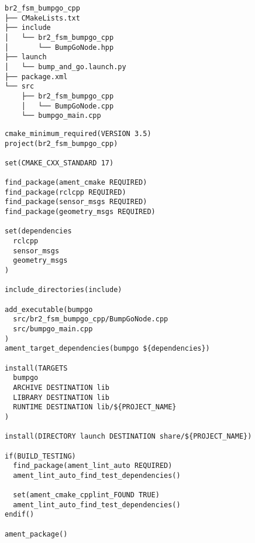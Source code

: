  \footnotesize
\begin{tcolorbox}[sharp corners, colframe=gray!80, colback=LightGray, left=0pt, top=0pt, bottom=0pt, title=Package \texttt{br2\_fsm\_bumpgo\_cpp}]
  \begin{verbatim}
br2_fsm_bumpgo_cpp
├── CMakeLists.txt
├── include
│   └── br2_fsm_bumpgo_cpp
│       └── BumpGoNode.hpp
├── launch
│   └── bump_and_go.launch.py
├── package.xml
└── src
    ├── br2_fsm_bumpgo_cpp
    │   └── BumpGoNode.cpp
    └── bumpgo_main.cpp    \end{verbatim}
    \end{tcolorbox}
  \normalsize

 \footnotesize
\begin{tcolorbox}[sharp corners, colframe=gray!80, colback=LightGray, left=0pt, top=0pt, bottom=0pt, title=\texttt{br2\_fsm\_bumpgo\_cpp/CMakeLists.txt}]
  \begin{verbatim}
cmake_minimum_required(VERSION 3.5)
project(br2_fsm_bumpgo_cpp)

set(CMAKE_CXX_STANDARD 17)

find_package(ament_cmake REQUIRED)
find_package(rclcpp REQUIRED)
find_package(sensor_msgs REQUIRED)
find_package(geometry_msgs REQUIRED)

set(dependencies
  rclcpp
  sensor_msgs
  geometry_msgs
)

include_directories(include)

add_executable(bumpgo
  src/br2_fsm_bumpgo_cpp/BumpGoNode.cpp
  src/bumpgo_main.cpp
)
ament_target_dependencies(bumpgo ${dependencies})

install(TARGETS
  bumpgo
  ARCHIVE DESTINATION lib
  LIBRARY DESTINATION lib
  RUNTIME DESTINATION lib/${PROJECT_NAME}
)

install(DIRECTORY launch DESTINATION share/${PROJECT_NAME})

if(BUILD_TESTING)
  find_package(ament_lint_auto REQUIRED)
  ament_lint_auto_find_test_dependencies()

  set(ament_cmake_cpplint_FOUND TRUE)
  ament_lint_auto_find_test_dependencies()
endif()

ament_package()
    \end{verbatim}
    \end{tcolorbox}
  \normalsize

